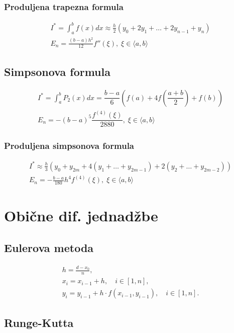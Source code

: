 \subsubsection{Produljena trapezna formula}

\begin{gather*}
I^* = \int_{a}^{b} f(x)dx \approx \frac{h}{2}(y_0+2y_1+\dots+2y_{n-1}+y_n)\\
E_n = \frac{(b-a)h^2}{12}f''(\xi),\; \xi\in\langle a, b \rangle
\end{gather*}

\subsection{Simpsonova formula}
\begin{gather*}
I^* = \int_a^b P_2(x)dx = \dfrac{b-a}{6}\left(f(a) + 4f\left(\dfrac{a+b}{2}\right) + f(b)\right)\\
E_n = -(b-a)^5\dfrac{f^{(4)}(\xi)}{2880},\; \xi\in\langle a, b \rangle
\end{gather*}

\subsubsection{Produljena simpsonova formula}

\begin{gather*}
    I^* \approx \frac{h}{3}(y_0+y_{2m}+4(y_1+\dots+y_{2m-1})+2(y_2+\dots+y_{2m-2}))\\
    E_n = -\frac{b-a}{180}h^4f^{(4)}(\xi),\; \xi\in\langle a, b \rangle
\end{gather*}


\section{Obične dif. jednadžbe}

\subsection{Eulerova metoda}

\begin{gather*}
    h=\frac{d - x_0}{n},\\
    x_i = x_{i-1} + h,\quad i \in [1, n],\\
    y_i = y_{i-1} + h\cdot f(x_{i-1}, y_{i-1}),\quad i \in [1, n].
\end{gather*}

\subsection{Runge-Kutta}

